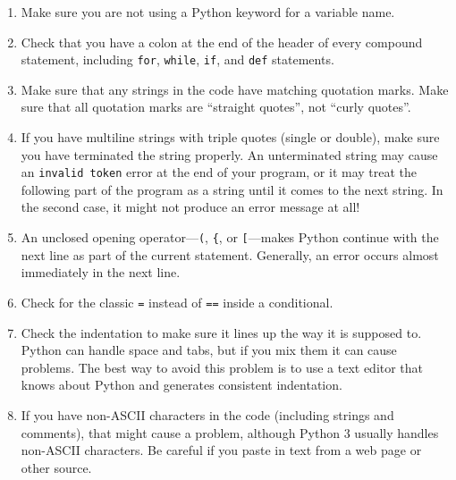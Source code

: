 \documentclass[10pt]{book}
\begin{document}
\begin{enumerate}

\item Make sure you are not using a Python keyword for a variable name.

\item Check that you have a colon at the end of the header of every
compound statement, including {\tt for}, {\tt while},
{\tt if}, and {\tt def} statements.

\item Make sure that any strings in the code have matching
quotation marks.  Make sure that all quotation marks are
``straight quotes'', not ``curly quotes''.

\item If you have multiline strings with triple quotes (single or double), make
sure you have terminated the string properly.  An unterminated string
may cause an {\tt invalid token} error at the end of your program,
or it may treat the following part of the program as a string until it
comes to the next string.  In the second case, it might not produce an error
message at all!

\item An unclosed opening operator---\verb+(+, \verb+{+, or
  \verb+[+---makes Python continue with the next line as part of the
  current statement.  Generally, an error occurs almost immediately in
  the next line.

\item Check for the classic {\tt =} instead of {\tt ==} inside
a conditional.

\item Check the indentation to make sure it lines up the way it
is supposed to.  Python can handle space and tabs, but if you mix
them it can cause problems.  The best way to avoid this problem
is to use a text editor that knows about Python and generates
consistent indentation.

\item If you have non-ASCII characters in the code (including strings
and comments), that might cause a problem, although Python 3 usually
handles non-ASCII characters.  Be careful if you paste in text from
a web page or other source.

\end{enumerate}
\end{document}
